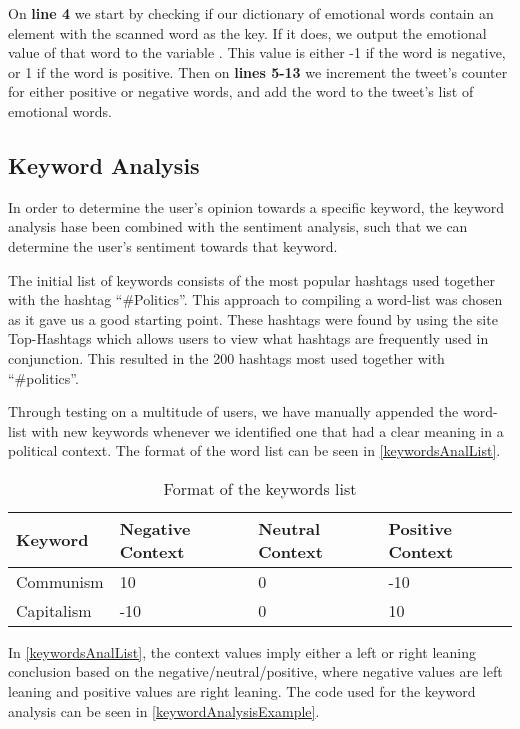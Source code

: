 On \textbf{line 4} we start by checking if our dictionary of emotional words
contain an element with the scanned word as the key. If it does, we output the
emotional value of that word to the variable . This value is
either -1 if the word is negative, or 1 if the word is positive. Then on
\textbf{lines 5-13} we increment the tweet's counter for either positive or
negative words, and add the word to the tweet's list of emotional words.

\subsection{Keyword Analysis}
In order to determine the user's opinion towards a specific keyword, the keyword
analysis hase been combined with the sentiment analysis, such that we can
determine the user's sentiment towards that keyword.

The initial list of keywords consists of the most popular hashtags used together
with the hashtag ``\#Politics''. This approach to compiling a word-list was
chosen as it gave us a good starting point. These hashtags were found by using
the site Top-Hashtags \citep{topHashtags} which allows users to view what
hashtags are frequently used in conjunction. This resulted in the 200 hashtags
most used together with ``\#politics''.\nl

Through testing on a multitude of users, we have manually appended the word-list
with new keywords whenever we identified one that had a clear meaning in a
political context. The format of the word list can be seen in
\autoref{keywordsAnalList}.\\

\begin{table}[H]
\begin{tabular}{|l|l|l|l|}\hline
\textbf{Keyword} & \textbf{Negative Context} & \textbf{Neutral Context} & \textbf{Positive Context} \\\hline
Communism & 10 & 0 & -10 \\\hline
Capitalism & -10 & 0 & 10 \\\hline
\end{tabular}
\caption{Format of the keywords list}
\label{keywordsAnalList}
\end{table} 

In \autoref{keywordsAnalList}, the context values imply either a left or
right leaning conclusion based on the negative/neutral/positive, where negative
values are left leaning and positive values are right leaning. The code used for
the keyword analysis can be seen in \autoref{keywordAnalysisExample}.\\

